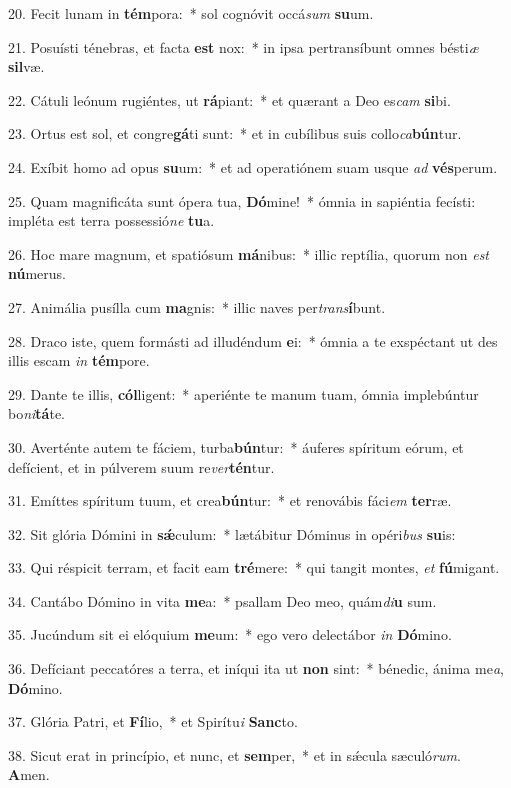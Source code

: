 20. Fecit lunam in \textbf{tém}pora:~*  sol cognóvit occá\textit{sum} \textbf{su}um.\

21. Posuísti ténebras, et facta \textbf{est} nox:~*  in ipsa pertransíbunt omnes bésti\textit{æ} \textbf{sil}væ.\

22. Cátuli leónum rugiéntes, ut \textbf{rá}piant:~*  et quærant a Deo es\textit{cam} \textbf{si}bi.\

23. Ortus est sol, et congre\textbf{gá}ti sunt:~*  et in cubílibus suis collo\textit{ca}\textbf{bún}tur.\

24. Exíbit homo ad opus \textbf{su}um:~*  et ad operatiónem suam usque \textit{ad} \textbf{vés}perum.\

25. Quam magnificáta sunt ópera tua, \textbf{Dó}mine!~*  ómnia in sapiéntia fecísti: impléta est terra possessió\textit{ne} \textbf{tu}a.\

26. Hoc mare magnum, et spatiósum \textbf{má}nibus:~*  illic reptília, quorum non \textit{est} \textbf{nú}merus.\

27. Animália pusílla cum \textbf{ma}gnis:~*  illic naves per\textit{trans}\textbf{í}bunt.\

28. Draco iste, quem formásti ad illudéndum \textbf{e}i:~*  ómnia a te exspéctant ut des illis escam \textit{in} \textbf{tém}pore.\

29. Dante te illis, \textbf{cól}ligent:~*  aperiénte te manum tuam, ómnia implebúntur bo\textit{ni}\textbf{tá}te.\

30. Averténte autem te fáciem, turba\textbf{bún}tur:~*  áuferes spíritum eórum, et defícient, et in púlverem suum re\textit{ver}\textbf{tén}tur.\

31. Emíttes spíritum tuum, et crea\textbf{bún}tur:~*  et renovábis fáci\textit{em} \textbf{ter}ræ.\

32. Sit glória Dómini in \textbf{sǽ}culum:~*  lætábitur Dóminus in opéri\textit{bus} \textbf{su}is:\

33. Qui réspicit terram, et facit eam \textbf{tré}mere:~*  qui tangit montes, \textit{et} \textbf{fú}migant.\

34. Cantábo Dómino in vita \textbf{me}a:~*  psallam Deo meo, quám\textit{di}\textbf{u} sum.\

35. Jucúndum sit ei elóquium \textbf{me}um:~*  ego vero delectábor \textit{in} \textbf{Dó}mino.\

36. Defíciant peccatóres a terra, et iníqui ita ut \textbf{non} sint:~*  bénedic, ánima me\textit{a}, \textbf{Dó}mino.\

37. Glória Patri, et \textbf{Fí}lio,~*  et Spirítu\textit{i} \textbf{Sanc}to.\

38. Sicut erat in princípio, et nunc, et \textbf{sem}per,~*  et in sǽcula sæculó\textit{rum}. \textbf{A}men.\

